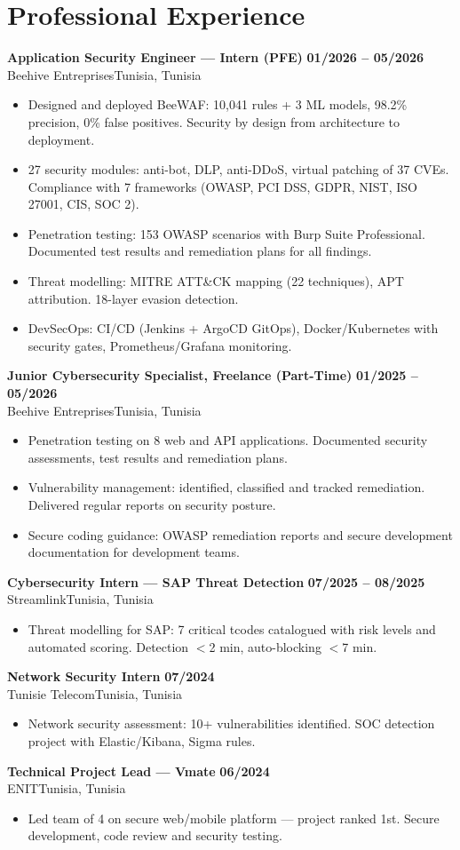 \documentclass[a4paper,9pt]{article}
\newcommand{\cventry}[4]{\textbf{#1} \hfill \textbf{#4}\\[0.2pt]#2{\ifx\relax#3\relax\else, #3\fi}\par\vspace{0.3pt}}
\begin{document}
\section{Professional Experience}
\cventry{Application Security Engineer --- Intern (PFE)}{Beehive Entreprises}{Tunisia}{01/2026 -- 05/2026}
\begin{itemize}
  \item Designed and deployed BeeWAF: 10,041 rules + 3 ML models, 98.2\% precision, 0\% false positives. Security by design from architecture to deployment.
  \item 27 security modules: anti-bot, DLP, anti-DDoS, virtual patching of 37 CVEs. Compliance with 7 frameworks (OWASP, PCI DSS, GDPR, NIST, ISO 27001, CIS, SOC 2).
  \item Penetration testing: 153 OWASP scenarios with Burp Suite Professional. Documented test results and remediation plans for all findings.
  \item Threat modelling: MITRE ATT\&CK mapping (22 techniques), APT attribution. 18-layer evasion detection.
  \item DevSecOps: CI/CD (Jenkins + ArgoCD GitOps), Docker/Kubernetes with security gates, Prometheus/Grafana monitoring.
\end{itemize}
\cventry{Junior Cybersecurity Specialist, Freelance (Part-Time)}{Beehive Entreprises}{Tunisia}{01/2025 -- 05/2026}
\begin{itemize}
  \item Penetration testing on 8 web and API applications. Documented security assessments, test results and remediation plans.
  \item Vulnerability management: identified, classified and tracked remediation. Delivered regular reports on security posture.
  \item Secure coding guidance: OWASP remediation reports and secure development documentation for development teams.
\end{itemize}
\cventry{Cybersecurity Intern --- SAP Threat Detection}{Streamlink}{Tunisia}{07/2025 -- 08/2025}
\begin{itemize}
  \item Threat modelling for SAP: 7 critical tcodes catalogued with risk levels and automated scoring. Detection $<$2 min, auto-blocking $<$7 min.
\end{itemize}
\cventry{Network Security Intern}{Tunisie Telecom}{Tunisia}{07/2024}
\begin{itemize}
  \item Network security assessment: 10+ vulnerabilities identified. SOC detection project with Elastic/Kibana, Sigma rules.
\end{itemize}
\cventry{Technical Project Lead --- Vmate}{ENIT}{Tunisia}{06/2024}
\begin{itemize}
  \item Led team of 4 on secure web/mobile platform --- project ranked 1st. Secure development, code review and security testing.
\end{itemize}
\end{document}
